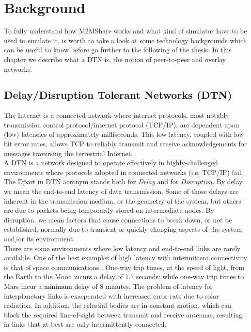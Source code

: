 
\chapter{Background}\label{background} %





To fully understand how M2MShare works and what kind of simulator have to be used to emulate it, is worth to take a look at some technology backgrounds which can be useful to know before go further to the following of the thesis. In this chapter we describe what a DTN is, the notion of peer-to-peer and overlay networks.

\section{Delay/Disruption Tolerant Networks (DTN)}
The Internet is a connected network where internet protocols, most notably transmission control protocol/internet protocol (TCP/IP), are dependent upon (low) latencies of approximately milliseconds. This low latency, coupled with low bit error rates, allows TCP to reliably transmit and receive acknowledgements for messages traversing the terrestrial Internet. 
\\

A DTN is a network designed to operate effectively in highly-challenged environments where protocols adopted in connected networks (i.e. TCP/IP) fail. The \"D\" part in DTN acronym stands both for \textit{Delay} and for \textit{Disruption}. By delay we mean the end-to-end latency of data transmission. Some of those delays are inherent in the transmission medium, or the geometry of the system, but others are due to packets being temporarily stored on intermediate nodes. By disruption, we mean factors that cause connections to break down, or not be established, normally due to transient or quickly changing aspects of the system and/or its environment.
\\

There are some environments where low latency and end-to-end links are rarely available. One of the best examples of high latency with intermittent connectivity is that of space communications \cite{Burleigh2003365}. One-way trip times, at the speed of light, from the Earth to the Moon incurs a delay of 1.7 seconds; while one-way trip times to Mars incur a minimum delay of 8 minutes. The problem of latency for interplanetary links is exasperated with increased error rate due to solar radiation. In addition, the celestial bodies are in constant motion, which can block the required line-of-sight between transmit and receive antennas, resulting in links that at best are only intermittently connected. 
\\

